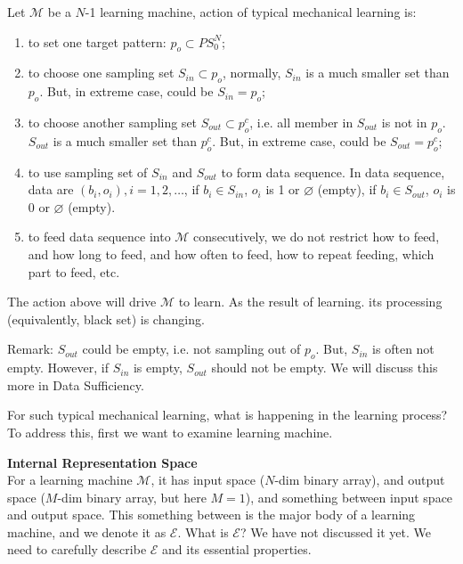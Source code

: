 \begin{definition}
Let $\mathcal{M}$ be a $N$-1 learning machine, action of typical mechanical learning is: 
\begin{enumerate} [topsep=0pt,itemsep=-1ex,partopsep=1ex,parsep=1ex]
\item to set one target pattern: $p_o \subset PS_0^N$; 
\item to choose one sampling set $S_{in} \subset p_o$, normally, $S_{in}$ is a much smaller set than $p_o$. But, in extreme case, could be $S_{in} = p_o$; 
\item to choose another sampling set $S_{out} \subset p_o^c$, i.e. all member in $S_{out}$ is not in $p_o$. $S_{out}$ is a much smaller set than $p_o^c$. But, in extreme case, could be $S_{out} = p_o^c$; 
\item to use sampling set of $S_{in}$ and $S_{out}$ to form data sequence. In data sequence, data are $(b_i, o_i), i = 1, 2, \ldots$, if $b_i \in S_{in}$, $o_i$ is 1 or $\varnothing$ (empty), if $b_i \in S_{out}$, $o_i$ is 0 or $\varnothing$ (empty). 
\item to feed data sequence into $\mathcal{M}$ consecutively, we do not restrict how to feed, and how long to feed, and how often to feed, how to repeat feeding, which part to feed, etc.
\end{enumerate}
The action above will drive $\mathcal{M}$ to learn. As the result of learning. its processing (equivalently, black set) is changing.
\end{definition}
Remark: $S_{out}$ could be empty, i.e. not sampling out of $p_o$. But, $S_{in}$ is often not empty. However, if $S_{in}$ is empty, $S_{out}$ should not be empty. We will discuss this more in Data Sufficiency. 
 
For such typical mechanical learning, what is happening in the learning process? To address this, first we want to examine learning machine.
\bigskip



{\bf Internal Representation Space }\\
For a learning machine $\mathcal{M}$, it has input space ($N$-dim binary array), and output space ($M$-dim binary array, but here $M=1$), and something between input space and output space. This something between is the major body of a learning machine, and we denote it as $\mathcal{E}$. What is $\mathcal{E}$? We have not discussed it yet. We need to carefully describe $\mathcal{E}$ and its essential properties.

